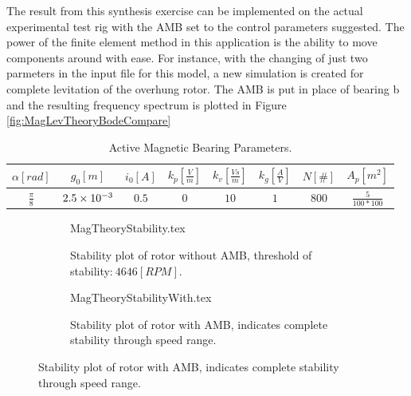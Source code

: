 The result from this synthesis exercise can be implemented on the actual experimental test rig with the AMB set to the control parameters suggested. The power of the finite element method in this application is the ability to move components around with ease. For instance, with the changing of just two parmeters in the input file for this model, a new simulation is created for complete levitation of the overhung rotor. The AMB is put in place of bearing b and the resulting frequency spectrum is plotted in Figure \ref{fig:MagLevTheoryBodeCompare}
\begin{table}
	\centering
	\caption{Active Magnetic Bearing Parameters.}
	\begin{tabular}{cccccccc}
		$\alpha[rad]$&$g_0[m]$&$i_0[A]$&$k_p[\frac{V}{m}]$&$k_v[\frac{Vs}{m}]$&$k_g[\frac{A}{V}]$&$ N[\#]$&$A_p[m^2]$\\\hline
		$\frac{\pi}{8}$&$2.5\times 10^{-3}$&$0.5$&$0$&$10$&$1$&$800$&$\frac{5}{100*100}$
	\end{tabular}
	\label{tab:MagBearingParameters}
\end{table}
\begin{figure}
	\begin{subfigure}{\textwidth/2}
		\def\width{.8\linewidth}
		\def\height{.4\linewidth}
		\centering
		{MagTheoryStability.tex}
		\caption{Stability plot of rotor without AMB, threshold of stability:$ \ 4646[RPM] $.}
		\label{fig:MagTheoryStability}
	\end{subfigure}
	\begin{subfigure}{\textwidth/2}
		\def\width{.8\linewidth}
		\def\height{.35\linewidth}
		\centering
		{MagTheoryStabilityWith.tex}
		\caption{Stability plot of rotor with AMB, indicates complete stability through speed range.}
		\label{fig:MagTheoryStabilityWith}
	\end{subfigure}
\end{figure}
